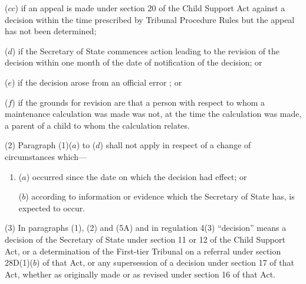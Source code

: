 \documentclass[12pt,a4paper]{article}
\begin{document}
\begin{enumerate}
($cc$) if an appeal is made under section 20 of the Child Support Act against a decision within the time prescribed 
by Tribunal Procedure Rules  %
but the appeal has not been determined;

($d$) if 
the Secretary of State  %
commences action leading to the revision of the decision within one month of the date of notification of the decision; or

($e$) if the decision arose from an official error%
%
; or

    ($f$) 
    if the grounds for revision are that a person with respect to whom a maintenance calculation was made was not, at the time the calculation was made, a parent of a child to whom the calculation relates.
\end{enumerate}

(2) Paragraph (1)($a$)  to ($d$)  shall not apply in respect of a change of circumstances which—
\begin{enumerate}\item[]
($a$) occurred since the date on which the decision had effect; or

($b$) according to information or evidence which the 
Secretary of State  %
has, is expected to occur.
\end{enumerate}


(3) In paragraphs (1), (2) and (5A) and in regulation 4(3) “decision” means a decision of the 
Secretary of State  %
under section %
11 or 12  %
of the Child Support Act, or a determination of 
the First-tier Tribunal  %
on a referral under section 28D(1)($b$)  of that Act, or any supersession of a decision under section 17 of that Act, whether as originally made or as revised under section 16 of that Act.
\end{document}
